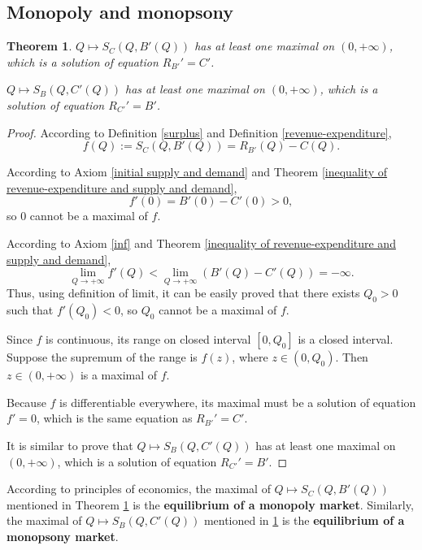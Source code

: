 \documentclass{article}
\newtheorem{theorem}{Theorem}[subsection]
\begin{document}
\subsection{Monopoly and monopsony}

\begin{theorem}
\label{monopoly and monopsony equilibrium}
$Q\mapsto S_C\left(Q,B'\left(Q\right)\right)$ has at least one maximal on $\left(0,+\infty\right)$, which is a solution of equation $R_{B'}'=C'$.

$Q\mapsto S_B\left(Q,C'\left(Q\right)\right)$ has at least one maximal on $\left(0,+\infty\right)$, which is a solution of equation $R_{C'}'=B'$.
\end{theorem}
\begin{proof}
According to Definition \ref{surplus} and Definition \ref{revenue-expenditure},
$$f\left(Q\right):=S_C\left(Q,B'\left(Q\right)\right)=R_{B'}\left(Q\right)-C\left(Q\right).$$

According to Axiom \ref{initial supply and demand} and Theorem \ref{inequality of revenue-expenditure and supply and demand},
$$f'\left(0\right)=B'\left(0\right)-C'\left(0\right)>0,$$
so $0$ cannot be a maximal of $f$.

According to Axiom \ref{inf} and Theorem \ref{inequality of revenue-expenditure and supply and demand},
$$\lim_{Q\to+\infty}f'\left(Q\right)<\lim_{Q\to+\infty}\left(B'\left(Q\right)-C'\left(Q\right)\right)=-\infty.$$
Thus, using definition of limit, it can be easily proved that there exists $Q_0>0$ such that $f'\left(Q_0\right)<0$,
so $Q_0$ cannot be a maximal of $f$.

Since $f$ is continuous, its range on closed interval $\left[0,Q_0\right]$ is a closed interval.
Suppose the supremum of the range is $f\left(z\right)$, where $z\in\left(0,Q_0\right)$.
Then $z\in\left(0,+\infty\right)$ is a maximal of $f$.

Because $f$ is differentiable everywhere, its maximal must be a solution of equation $f'=0$,
which is the same equation as $R_{B'}'=C'$.

It is similar to prove that $Q\mapsto S_B\left(Q,C'\left(Q\right)\right)$ has at least one maximal on $\left(0,+\infty\right)$, which is a solution of equation $R_{C'}'=B'$.
\end{proof}

According to principles of economics,
the maximal of $Q\mapsto S_C\left(Q,B'\left(Q\right)\right)$ mentioned in Theorem \ref{monopoly and monopsony equilibrium}
is the \textbf{equilibrium of a monopoly market}.
Similarly, the maximal of $Q\mapsto S_B\left(Q,C'\left(Q\right)\right)$ mentioned in \ref{monopoly and monopsony equilibrium}
is the \textbf{equilibrium of a monopsony market}.
\end{document}
